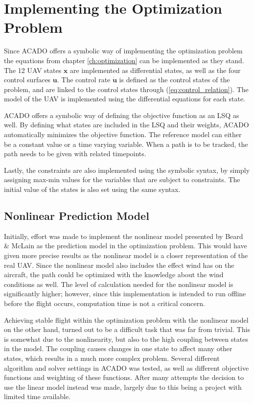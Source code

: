 \section{Implementing the Optimization Problem}

Since ACADO offers a symbolic way of implementing the optimization problem the equations from chapter \ref{ch:optimization} can be implemented as they stand. The 12 UAV states $\mathbf{x}$ are implemented as differential states, as well as the four control surfaces $\mathbf{u}$. The control rate $\mathbf{\dot{u}}$ is defined as the control states of the problem, and are linked to the control states through (\ref{eq:control_relation}). The model of the UAV is implemented using the differential equations for each state.

ACADO offers a symbolic way of defining the objective function as an LSQ as well. By defining what states are included in the LSQ and their weights, ACADO automatically minimizes the objective function. The reference model can either be a constant value or a time varying variable. When a path is to be tracked, the path needs to be given with related timepoints.

Lastly, the constraints are also implemented using the symbolic syntax, by simply assigning max-min values for the variables that are subject to constraints. The initial value of the states is also set using the same syntax. 


\subsection{Nonlinear Prediction Model}

Initially, effort was made to implement the nonlinear model presented by Beard \& McLain \cite{uavBEARD} as the prediction model in the optimization problem. This would have given more precise results as the nonlinear model is a closer representation of the real UAV. Since the nonlinear model also includes the effect wind has on the aircraft, the path could be optimized with the knowledge about the wind conditions as well. The level of calculation needed for the nonlinear model is significantly higher; however, since this implementation is intended to run offline before the flight occurs, computation time is not a critical concern.

Achieving stable flight within the optimization problem with the nonlinear model on the other hand, turned out to be a difficult task that was far from trivial. This is somewhat due to the nonlinearity, but also to the high coupling between states in the model. The coupling causes changes in one state to affect many other states, which results in a much more complex problem. Several different algorithm and solver settings in ACADO was tested, as well as different objective functions and weighting of these functions. After many attempts the decision to use the linear model instead was made, largely due to this being a project with limited time available.


